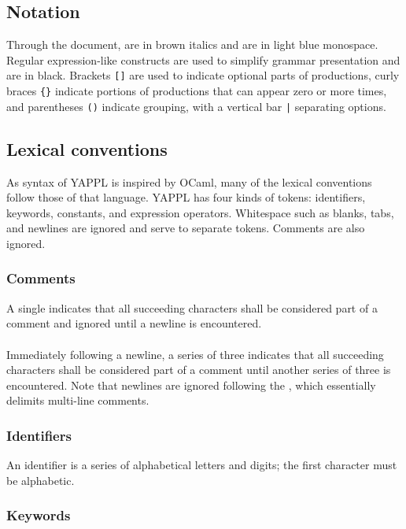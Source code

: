 
\subsection{Notation}

Through the document,  are in brown italics and  are in light blue monospace. Regular expression-like constructs are used to simplify grammar presentation and are in black. Brackets \texttt{[]} are used to indicate optional parts of productions, curly braces \texttt{\{\}} indicate portions of productions that can appear zero or more times, and parentheses \texttt{()} indicate grouping, with a vertical bar \texttt{|} separating options. 

\subsection{Lexical conventions}

As syntax of YAPPL is inspired by OCaml, many of the lexical conventions follow those of that language. YAPPL has four kinds of tokens: identifiers, keywords, constants, and expression operators. Whitespace such as blanks, tabs, and newlines are ignored and serve to separate tokens. Comments are also ignored.

\subsubsection{Comments}

A single \term{\#} indicates that all succeeding characters shall be considered part of a comment and ignored until a newline is encountered. \\
\\
Immediately following a newline, a series of three \term{\#\#\#} indicates that all succeeding characters shall be considered part of a comment until another series of three \term{\#\#\#} is encountered. Note that newlines are ignored following the \term{\#\#\#}, which essentially delimits multi-line comments.

\subsubsection{Identifiers}

An identifier is a series of alphabetical letters and digits; the first character must be alphabetic. 

\subsubsection{Keywords}

